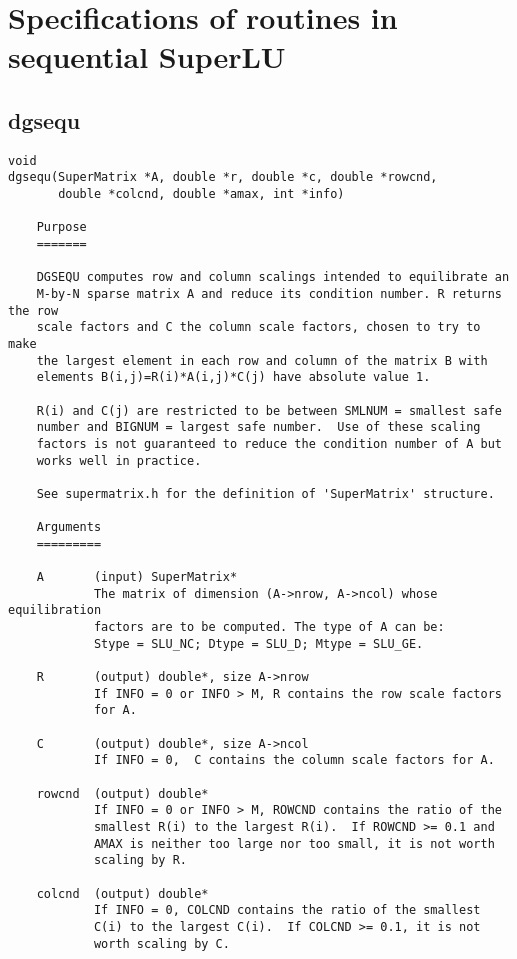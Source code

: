 \appendix
\chapter{Specifications of routines in sequential SuperLU}
\label{chap:superlu_spec}

\section{dgsequ}
\begin{verbatim}
void
dgsequ(SuperMatrix *A, double *r, double *c, double *rowcnd,
       double *colcnd, double *amax, int *info)

    Purpose   
    =======   

    DGSEQU computes row and column scalings intended to equilibrate an   
    M-by-N sparse matrix A and reduce its condition number. R returns the row
    scale factors and C the column scale factors, chosen to try to make   
    the largest element in each row and column of the matrix B with   
    elements B(i,j)=R(i)*A(i,j)*C(j) have absolute value 1.   

    R(i) and C(j) are restricted to be between SMLNUM = smallest safe   
    number and BIGNUM = largest safe number.  Use of these scaling   
    factors is not guaranteed to reduce the condition number of A but   
    works well in practice.   

    See supermatrix.h for the definition of 'SuperMatrix' structure.
 
    Arguments   
    =========   

    A       (input) SuperMatrix*
            The matrix of dimension (A->nrow, A->ncol) whose equilibration
            factors are to be computed. The type of A can be:
            Stype = SLU_NC; Dtype = SLU_D; Mtype = SLU_GE.
	    
    R       (output) double*, size A->nrow
            If INFO = 0 or INFO > M, R contains the row scale factors   
            for A.
	    
    C       (output) double*, size A->ncol
            If INFO = 0,  C contains the column scale factors for A.
	    
    rowcnd  (output) double*
            If INFO = 0 or INFO > M, ROWCND contains the ratio of the   
            smallest R(i) to the largest R(i).  If ROWCND >= 0.1 and   
            AMAX is neither too large nor too small, it is not worth   
            scaling by R.
	    
    colcnd  (output) double*
            If INFO = 0, COLCND contains the ratio of the smallest   
            C(i) to the largest C(i).  If COLCND >= 0.1, it is not   
            worth scaling by C.
	    

\end{verbatim}
